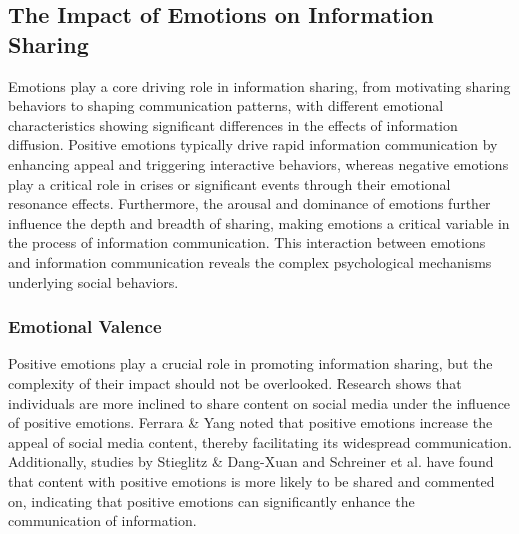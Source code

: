 \subsection{The Impact of Emotions on Information Sharing}
Emotions play a core driving role in information sharing, from motivating sharing behaviors to shaping communication patterns, with different emotional characteristics showing significant differences in the effects of information diffusion. Positive emotions typically drive rapid information communication by enhancing appeal and triggering interactive behaviors, whereas negative emotions play a critical role in crises or significant events through their emotional resonance effects. Furthermore, the arousal and dominance of emotions further influence the depth and breadth of sharing, making emotions a critical variable in the process of information communication. This interaction between emotions and information communication reveals the complex psychological mechanisms underlying social behaviors.



\subsubsection{Emotional Valence}
Positive emotions play a crucial role in promoting information sharing, but the complexity of their impact should not be overlooked. Research shows that individuals are more inclined to share content on social media under the influence of positive emotions. Ferrara \& Yang \cite{ferrara2015measuring} noted that positive emotions increase the appeal of social media content, thereby facilitating its widespread communication. Additionally, studies by Stieglitz \& Dang-Xuan \cite{stieglitz2013emotions} and Schreiner et al. \cite{schreiner2021impact} have found that content with positive emotions is more likely to be shared and commented on, indicating that positive emotions can significantly enhance the communication of information.

